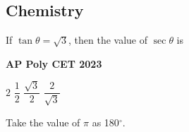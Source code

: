 \documentclass[11pt,paper=a4,answers]{exam}
\begin{document}
\subsection*{Chemistry}
\begin{multicols}{2}
\begin{questions}
\question
If $\tan  \theta = \sqrt{3}$, then the value of $\sec \theta$ is
\begin{flushright}
\small\textbf{AP Poly CET 2023}
\end{flushright}


\begin{choices}
\choice $\displaystyle 2$ 
\choice $\displaystyle \dfrac{1}{2}$ 
\choice $\displaystyle \dfrac{\sqrt{3}}{2}$ 
\choice $\displaystyle \dfrac{2}{\sqrt{3}}$  
\end{choices}
\end{questions}

\end{multicols}

\begin{center}
\Large{Take the value of $\pi$ as 180${^\circ}$.}
\end{center}

\newpage
\end{document}
